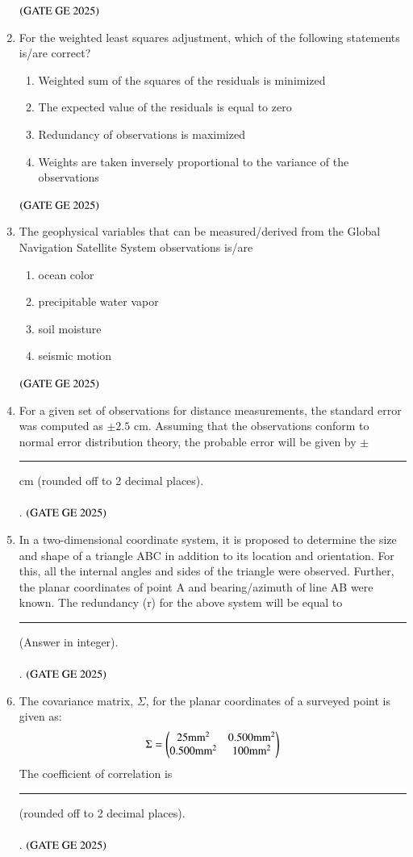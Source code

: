 \documentclass[journal,12pt,onecolumn]{IEEEtran}
\theoremstyle{remark}
\begin{document}
\begin{enumerate}
\begin{enumerate}
\end{enumerate}
\hfill $\left(\text{GATE GE 2025}\right)$
\bigskip
\item For the weighted least squares adjustment, which of the following statements is/are correct?
\begin{enumerate}
\item Weighted sum of the squares of the residuals is minimized
\item The expected value of the residuals is equal to zero
\item Redundancy of observations is maximized
\item Weights are taken inversely proportional to the variance of the observations
\end{enumerate}
\hfill $\left(\text{GATE GE 2025}\right)$
\bigskip
\item The geophysical variables that can be measured/derived from the Global Navigation Satellite System observations is/are
\begin{enumerate}
\item ocean color
\item precipitable water vapor
\item soil moisture
\item seismic motion
\end{enumerate}
\hfill $\left(\text{GATE GE 2025}\right)$
\bigskip
\item For a given set of observations for distance measurements, the standard error was computed as $\pm 2.5$ cm. Assuming that the observations conform to normal error distribution theory, the probable error will be given by $\pm$ \rule{2cm}{0.5mm} cm (rounded off to 2 decimal places).
\\
\\.
\hfill $\left(\text{GATE GE 2025}\right)$
\bigskip
\item In a two-dimensional coordinate system, it is proposed to determine the size and shape of a triangle ABC in addition to its location and orientation. For this, all the internal angles and sides of the triangle were observed. Further, the planar coordinates of point A and bearing/azimuth of line AB were known. The redundancy (r) for the above system will be equal to \rule{2cm}{0.5mm} (Answer in integer).
\\
\\.
\hfill $\left(\text{GATE GE 2025}\right)$
\bigskip
\item The covariance matrix, $\Sigma$, for the planar coordinates of a surveyed point is given as:
\[
\Sigma = 
\begin{pmatrix}
25  \text{mm}^2 & 0.500  \text{mm}^2 \\
0.500  \text{mm}^2 & 100  \text{mm}^2
\end{pmatrix}
\]
The coefficient of correlation is \rule{2cm}{0.5mm} (rounded off to 2 decimal places).
\\
\\.
\hfill $\left(\text{GATE GE 2025}\right)$
\bigskip
\end{enumerate}
\end{document}
